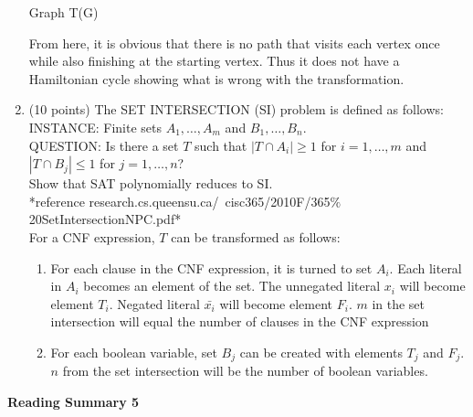\documentclass[11pt]{article}
\begin{document}
\begin{enumerate}
\begin{center}
	  Graph T(G)
	\end{center}
	From here, it is obvious that there is no path that visits each vertex once while also finishing at the starting vertex. Thus
	it does not have a Hamiltonian cycle showing what is wrong with the transformation.
  \item (10 points) The SET INTERSECTION (SI) problem is defined as follows: \\
	INSTANCE: Finite sets $A_1,\ldots,A_m$ and $B_1,\ldots,B_n$. \\
	QUESTION: Is there a set $T$ such that $|T\cap A_i|\ge 1$ for $i=1,\ldots,m$ and $|T\cap B_j|\le 1$ for $j=1,\ldots,n$? \\
	Show that SAT polynomially reduces to SI. \\
	*reference research.cs.queensu.ca/~cisc365/2010F/365$\%$20SetIntersectionNPC.pdf* \\

	For a CNF expression, $T$ can be transformed as follows:
	\begin{enumerate}
	 \item For each clause in the CNF expression, it is turned to set $A_i$. Each literal in $A_i$ becomes an element of the set. The unnegated
	 literal $x_i$ will become element $T_i$. Negated literal $\bar{x_i}$ will become element $F_i$. $m$ in the set intersection will equal the
	 number of clauses in the CNF expression
	 \item For each boolean variable, set $B_j$ can be created with elements $T_j$ and $F_j$. $n$ from the set intersection will be the
	 number of boolean variables.
	\end{enumerate}
	
\end{enumerate}

\pagebreak
\setlength{\parindent}{1cm}
\centerline{\bf Reading Summary 5}

\begin{spacing}{1.5}
 
\end{spacing}
\end{document}
